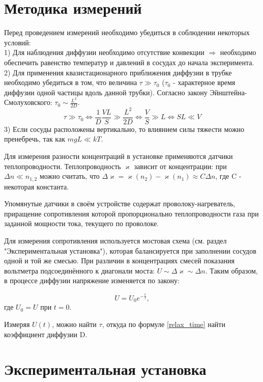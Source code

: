 \documentclass[15pt,a5paper,reqno]{article}
\renewcommand{\kappa}{\varkappa}
\begin{document}
	\section{Методика измерений}
    
    Перед проведением измерений необходимо убедиться в соблюдении некоторых условий:\\
    1) Для наблюдения диффузии необходимо отсутствие конвекции $\Rightarrow$ необходимо обеспечить равенство температур и давлений в сосудах до начала эксперимента.\\
    2) Для применения квазистационарного приближения диффузии в трубке необходимо убедиться в том, что величина $\tau \gg \tau_0$ ($\tau_0$ - характерное время диффузии одной частицы вдоль данной трубки). Согласно закону Эйнштейна-Смолуховского: $\tau_0 \sim \frac{L^2}{2D}$.\\
    \[\tau \gg \tau_0 \iff \frac{1}{D}\frac{VL}{S}\gg \frac{L^2}{2D} \iff \frac{V}{S} \gg L \iff SL \ll V\]
    3) Если сосуды расположены вертикально, то влиянием силы тяжести можно пренебречь, так как $mgL \ll kT$.
    
    Для измерения разности концентраций в установке применяются датчики теплопроводности. Теплопроводность $\kappa$ зависит от концентрации: при $\Delta n \ll n_{1, 2}$ можно считать, что $\Delta\kappa = \kappa(n_2) - \kappa(n_1) \approx C\Delta n$, где C - некоторая константа.
    
    Упомянутые датчики в своём устройстве содержат проволоку-нагреватель, приращение сопротивления которой пропорционально теплопроводности газа при заданной мощности тока, текущего по проволоке.
    
    Для измерения сопротивления используется мостовая схема (см. раздел "Экспериментальная установка"), которая балансируется при заполнении сосудов одной и той же смесью. При различии в концентрациях смесей показания вольтметра подсоединённого к диагонали моста: $U \sim \Delta\kappa \sim \Delta n$. Таким образом, в процессе диффузии напряжение изменяется по закону:
    
    \begin{equation}\label{voltage}
        U = U_0 e^{-\frac{t}{\tau}},
    \end{equation}
    где $U_0 = U$ при $t = 0$.
    
    Измеряя $U(t)$, можно найти $\tau$, откуда по формуле \eqref{relax_time} найти коэффициент диффузии D.
    
\section{Экспериментальная установка}
	
\end{document}
